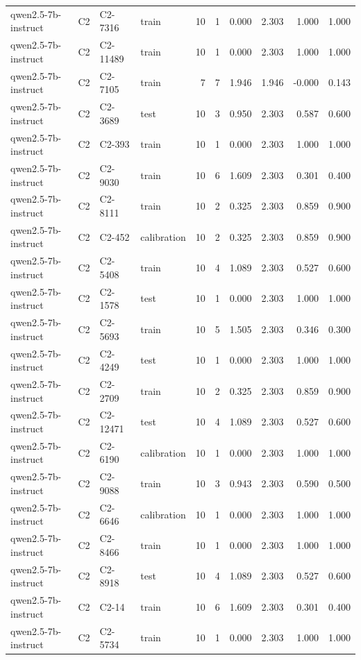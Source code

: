 \begin{table}
\begin{tabular}{llllrrrrrr}
qwen2.5-7b-instruct & C2 & C2-7316 & train & 10 & 1 & 0.000 & 2.303 & 1.000 & 1.000 \\
qwen2.5-7b-instruct & C2 & C2-11489 & train & 10 & 1 & 0.000 & 2.303 & 1.000 & 1.000 \\
qwen2.5-7b-instruct & C2 & C2-7105 & train & 7 & 7 & 1.946 & 1.946 & -0.000 & 0.143 \\
qwen2.5-7b-instruct & C2 & C2-3689 & test & 10 & 3 & 0.950 & 2.303 & 0.587 & 0.600 \\
qwen2.5-7b-instruct & C2 & C2-393 & train & 10 & 1 & 0.000 & 2.303 & 1.000 & 1.000 \\
qwen2.5-7b-instruct & C2 & C2-9030 & train & 10 & 6 & 1.609 & 2.303 & 0.301 & 0.400 \\
qwen2.5-7b-instruct & C2 & C2-8111 & train & 10 & 2 & 0.325 & 2.303 & 0.859 & 0.900 \\
qwen2.5-7b-instruct & C2 & C2-452 & calibration & 10 & 2 & 0.325 & 2.303 & 0.859 & 0.900 \\
qwen2.5-7b-instruct & C2 & C2-5408 & train & 10 & 4 & 1.089 & 2.303 & 0.527 & 0.600 \\
qwen2.5-7b-instruct & C2 & C2-1578 & test & 10 & 1 & 0.000 & 2.303 & 1.000 & 1.000 \\
qwen2.5-7b-instruct & C2 & C2-5693 & train & 10 & 5 & 1.505 & 2.303 & 0.346 & 0.300 \\
qwen2.5-7b-instruct & C2 & C2-4249 & test & 10 & 1 & 0.000 & 2.303 & 1.000 & 1.000 \\
qwen2.5-7b-instruct & C2 & C2-2709 & train & 10 & 2 & 0.325 & 2.303 & 0.859 & 0.900 \\
qwen2.5-7b-instruct & C2 & C2-12471 & test & 10 & 4 & 1.089 & 2.303 & 0.527 & 0.600 \\
qwen2.5-7b-instruct & C2 & C2-6190 & calibration & 10 & 1 & 0.000 & 2.303 & 1.000 & 1.000 \\
qwen2.5-7b-instruct & C2 & C2-9088 & train & 10 & 3 & 0.943 & 2.303 & 0.590 & 0.500 \\
qwen2.5-7b-instruct & C2 & C2-6646 & calibration & 10 & 1 & 0.000 & 2.303 & 1.000 & 1.000 \\
qwen2.5-7b-instruct & C2 & C2-8466 & train & 10 & 1 & 0.000 & 2.303 & 1.000 & 1.000 \\
qwen2.5-7b-instruct & C2 & C2-8918 & test & 10 & 4 & 1.089 & 2.303 & 0.527 & 0.600 \\
qwen2.5-7b-instruct & C2 & C2-14 & train & 10 & 6 & 1.609 & 2.303 & 0.301 & 0.400 \\
qwen2.5-7b-instruct & C2 & C2-5734 & train & 10 & 1 & 0.000 & 2.303 & 1.000 & 1.000 \\

\end{tabular}
\end{table}
